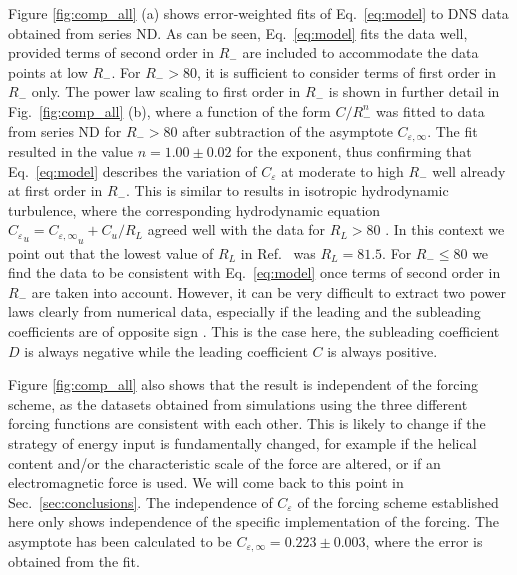 \documentclass[aps,pre,onecolumn,superscriptaddress,notitlepage]{revtex4-1}
\newcommand{\Ceps}{C_\varepsilon}
\newcommand{\Cinf}{C_{\varepsilon,\infty}}
\newcommand{\blue}[1]{{#1}}
\begin{document}
Figure \ref{fig:comp_all} (a) shows error-weighted
fits of Eq.~\eqref{eq:model} to DNS data obtained from series ND. As can be seen,
Eq.~\eqref{eq:model} fits the data well, provided terms of 
second order in $R_{-}$ are included \blue{to accommodate the data points at
low $R_{-}$}. For $R_{-} > 80$, it is sufficient to consider 
terms of first order in $R_{-}$ only. \blue{The power law scaling to first order in 
$R_{-}$ is shown in further detail in Fig.~\ref{fig:comp_all} (b), 
where a function of the form $C/R_-^n$ was fitted to data from series ND 
for $R_- > 80$ after subtraction of the asymptote $\Cinf$. 
The fit resulted in the value $n = 1.00 \pm 0.02$ for the exponent, 
thus confirming that Eq.~\eqref{eq:model} describes the variation 
of $\Ceps$ at moderate to high $R_-$  well already at first order 
in $R_{-}$. This is similar to results in isotropic hydrodynamic
turbulence, where the corresponding hydrodynamic
equation ${\Ceps}_u = {\Cinf}_u + C_u/R_L$ agreed well with the 
data for $R_L > 80$ \cite{McComb15a}. In this context we point out that 
the lowest value of $R_L$ in Ref.~\cite{McComb15a} was $R_L = 81.5$.    
For $R_{-} \leqslant 80$ we find the data to be consistent 
with Eq.~\eqref{eq:model} once terms of second order in $R_{-}$
are taken into account. However, it can be very difficult to extract 
two power laws clearly from numerical data, especially if the leading and the 
subleading coefficients are of opposite sign \cite{Biferale04,Mitra05}. 
This is the case here, the subleading coefficient $D$ is always 
negative while the leading coefficient $C$ is always positive.    
}

Figure \ref{fig:comp_all} also shows that the result is independent of the 
forcing scheme, as the datasets obtained from simulations 
using the three different forcing functions are consistent with each other. 
This is likely to change if the strategy of energy input is fundamentally
changed, for example if the helical content and/or the characteristic scale 
of the force are altered, or if 
an electromagnetic force is used. We will come back to this point in Sec.~\ref{sec:conclusions}.
The independence of $\Ceps$ of the 
forcing scheme established here only shows independence of
the specific implementation of the forcing. 
The asymptote has been calculated to be $\Cinf=0.223 \pm 0.003$, 
where the error is obtained from the fit. 
\end{document}
